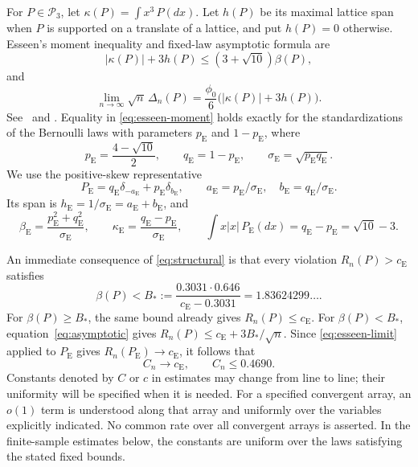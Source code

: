 \documentclass[aop]{imsart}
\theoremstyle{plain}
\theoremstyle{definition}
\theoremstyle{definition}
\newcommand{\Pthree}{\mathcal P_3}
\newcommand{\ce}{c_{\mathrm E}}
\newcommand{\pe}{p_{\mathrm E}}
\newcommand{\qe}{q_{\mathrm E}}
\newcommand{\se}{\sigma_{\mathrm E}}
\newcommand{\be}{\beta_{\mathrm E}}
\newcommand{\ke}{\kappa_{\mathrm E}}
\newcommand{\Pe}{P_{\mathrm E}}
\newcommand{\aE}{a_{\mathrm E}}
\newcommand{\bE}{b_{\mathrm E}}
\begin{document}
For \(P\in\Pthree\), let \(\kappa(P)=\int x^3\,P(dx)\). Let \(h(P)\) be its maximal lattice span when \(P\) is supported on a translate of a lattice, and put \(h(P)=0\) otherwise. Esseen's moment inequality and fixed-law asymptotic formula are
\begin{equation}\label{eq:esseen-moment}
 |\kappa(P)|+3h(P)\le(3+\sqrt{10})\beta(P),
\end{equation}
and
\begin{equation}\label{eq:esseen-limit}
 \lim_{n\to\infty}\sqrt n\,\Delta_n(P)
 =\frac{\phi_0}{6}\bigl(|\kappa(P)|+3h(P)\bigr).
\end{equation}
See~\cite{Esseen1945,Esseen1956} and
\cite[Section~1.1, equations~(1.5)--(1.9), p.~491]{MattnerShevtsova2019}. Equality in \eqref{eq:esseen-moment} holds exactly for the standardizations of the Bernoulli laws with parameters \(\pe\) and \(1-\pe\), where
\begin{equation}\label{eq:esseen-parameters}
 \pe=\frac{4-\sqrt{10}}2,\qquad \qe=1-\pe,
 \qquad \se=\sqrt{\pe\qe}.
\end{equation}
We use the positive-skew representative
\begin{equation}\label{eq:esseen-law}
 \Pe=\qe\delta_{-\aE}+\pe\delta_{\bE},
 \qquad \aE=\pe/\se,\quad \bE=\qe/\se.
\end{equation}
Its span is \(h_{\mathrm E}=1/\se=\aE+\bE\), and
\begin{equation}\label{eq:esseen-identities}
 \be=\frac{\pe^2+\qe^2}{\se},\qquad
 \ke=\frac{\qe-\pe}{\se},\qquad
 \int x|x|\,\Pe(dx)=\qe-\pe=\sqrt{10}-3.
\end{equation}

An immediate consequence of \eqref{eq:structural} is that every violation \(R_n(P)>\ce\) satisfies
\begin{equation}\label{eq:moment-cutoff}
 \beta(P)<B_*:=\frac{0.3031\cdot0.646}{\ce-0.3031}
 =1.83624299\ldots.
\end{equation}
For \(\beta(P)\ge B_*\), the same bound already gives \(R_n(P)\le\ce\). For \(\beta(P)<B_*\), equation~\eqref{eq:asymptotic} gives \(R_n(P)\le\ce+3B_*/\sqrt n\). Since \eqref{eq:esseen-limit} applied to \(\Pe\) gives \(R_n(\Pe)\to\ce\), it follows that
\begin{equation}\label{eq:cn-limit}
 C_n\longrightarrow\ce,\qquad C_n\le0.4690.
\end{equation}
Constants denoted by \(C\) or \(c\) in estimates may change from line to line; their uniformity will be specified when it is needed.
For a specified convergent array, an \(o(1)\) term is understood along
that array and uniformly over the variables explicitly indicated.
No common rate over all convergent arrays is asserted. In the
finite-sample estimates below, the constants are uniform over the
laws satisfying the stated fixed bounds.
\end{document}
